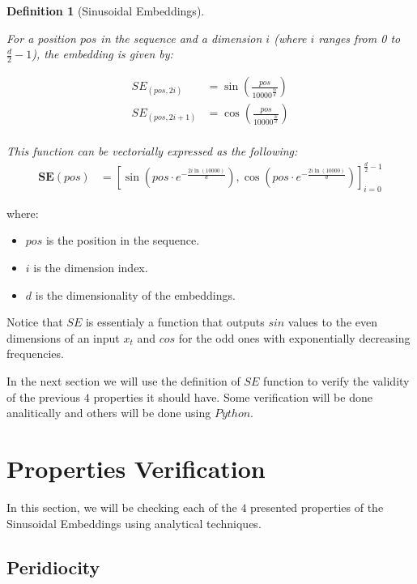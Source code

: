 \documentclass{article}
\newtheorem{definition}{Definition}[section]
\begin{document}
\begin{definition}[Sinusoidal Embeddings]
	\label{def:sin_embedding}
	
	For a position \( pos \) in the sequence and a dimension \( i \) (where \( i \) ranges from 0 to \( \frac{d}{2}-1 \)), the embedding is given by:
	
	\begin{align}
		SE_{(pos, 2i)} &= \sin\left(\frac{pos}{10000^{\frac{2i}{d}}}\right) \\
		SE_{(pos, 2i+1)} &= \cos\left(\frac{pos}{10000^{\frac{2i}{d}}}\right) \\
	\end{align}
	
	This function can be vectorially expressed as the following: 
	\begin{align}
		\mathbf{SE}(pos) &= \left[ \sin\left(pos \cdot e^{- \frac{2i \ln(10000)}{d}}\right), \cos\left(pos \cdot e^{- \frac{2i \ln(10000)}{d}}\right) \right]_{i=0}^{\frac{d}{2}-1}
	\end{align}
	

\end{definition}

where:

\begin{itemize}
	\item \( pos \) is the position in the sequence.
	\item  \( i \) is the dimension index.
	\item  \( d \) is the dimensionality of the embeddings.
\end{itemize}


Notice that $SE$ is essentialy a function that outputs $sin$ values to the even dimensions of an input $x_t$ and $cos$ for the odd ones with exponentially decreasing frequencies.


In the next section we will use the definition of  $SE$ function to verify the validity of the previous $4$ properties it should have. Some verification will be done analitically and others will be done using $Python$.

\section{Properties Verification}

In this section, we will be checking each of the $4$ presented properties of the Sinusoidal Embeddings using analytical techniques.


\subsection{Peridiocity}
\end{document}
